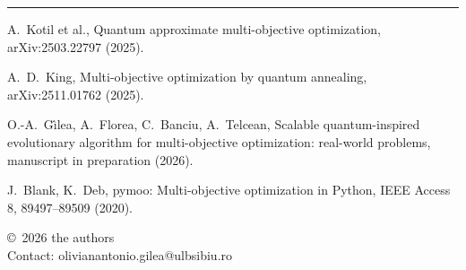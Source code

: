 \documentclass{article}
\newcommand{\tinyfont}{\fontsize{19}{24}\selectfont}
\begin{document}
\vfill
{\color{rulegray}\rule{\textwidth}{2mm}}\par
\vspace{8mm}
\noindent
\begin{minipage}[t]{0.72\textwidth}
\tinyfont
[1] A.~Kotil et al., Quantum approximate multi-objective optimization, arXiv:2503.22797 (2025).\par
[2] A.~D.~King, Multi-objective optimization by quantum annealing, arXiv:2511.01762 (2025).\par
[3] O.-A.~G\^{\i}lea, A.~Florea, C.~Banciu, A.~Telcean, Scalable quantum-inspired evolutionary
algorithm for multi-objective optimization: real-world problems, manuscript in preparation (2026).\par
[4] J.~Blank, K.~Deb, pymoo: Multi-objective optimization in Python, IEEE Access 8,
89497--89509 (2020).
\end{minipage}%
\hfill
\begin{minipage}[t]{0.25\textwidth}
\raggedleft\tinyfont
\copyright\ 2026 the authors\\
Contact: olivianantonio.gilea@ulbsibiu.ro
\end{minipage}
\end{document}
